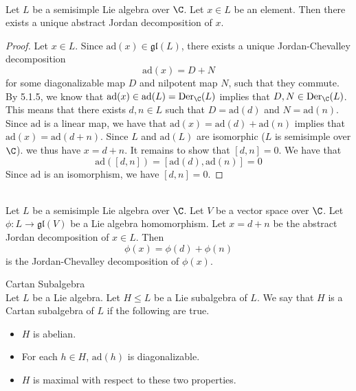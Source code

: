 \documentclass[a4paper]{article}
\begin{document}
\begin{lmm}{}{} \\Let $L$ be a semisimple Lie algebra over $\C$. Let $x\in L$ be an element. Then there exists a unique abstract Jordan decomposition of $x$. 
\begin{proof}
Let $x\in L$. Since $\text{ad}(x)\in\mathfrak{gl}(L)$, there exists a unique Jordan-Chevalley decomposition $$\text{ad}(x)=D+N$$ for some diagonalizable map $D$ and nilpotent map $N$, such that they commute. By 5.1.5, we know that $\text{ad}(x)\in\text{ad}(L)=\text{Der}_\C(L)$ implies that $D,N\in\text{Der}_\C(L)$. This means that there exists $d,n\in L$ such that $D=\text{ad}(d)$ and $N=\text{ad}(n)$. Since $\text{ad}$ is a linear map, we have that $\text{ad}(x)=\text{ad}(d)+\text{ad}(n)$ implies that $\text{ad}(x)=\text{ad}(d+n)$. Since $L$ and $\text{ad}(L)$ are isomorphic ($L$ is semisimple over $\C$). we thus have $x=d+n$. It remains to show that $[d,n]=0$. We have that $$\text{ad}([d,n])=[\text{ad}(d),\text{ad}(n)]=0$$ Since $\text{ad}$ is an isomorphism, we have $[d,n]=0$. 
\end{proof}
\end{lmm}

\begin{prp}{}{} \\Let $L$ be a semisimple Lie algebra over $\C$. Let $V$ be a vector space over $\C$. Let $\phi:L\to\mathfrak{gl}(V)$ be a Lie algebra homomorphism. Let $x=d+n$ be the abstract Jordan decomposition of $x\in L$. Then $$\phi(x)=\phi(d)+\phi(n)$$ is the Jordan-Chevalley decomposition of $\phi(x)$. 
\end{prp}

\begin{defn}{Cartan Subalgebra}{} \\Let $L$ be a Lie algebra. Let $H\leq L$ be a Lie subalgebra of $L$. We say that $H$ is a Cartan subalgebra of $L$ if the following are true. 
\begin{itemize}
\item $H$ is abelian. 
\item For each $h\in H$, $\text{ad}(h)$ is diagonalizable. 
\item $H$ is maximal with respect to these two properties. 
\end{itemize}
\end{defn}
\end{document}
